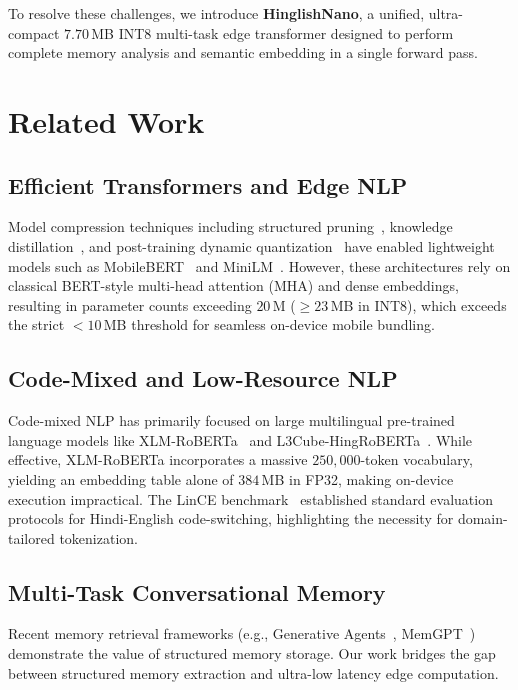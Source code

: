 \documentclass[11pt,a4paper]{article}
\begin{document}
To resolve these challenges, we introduce \textbf{HinglishNano}, a unified, ultra-compact $7.70$\,MB INT8 multi-task edge transformer designed to perform complete memory analysis and semantic embedding in a single forward pass.

\section{Related Work}

\subsection{Efficient Transformers and Edge NLP}
Model compression techniques including structured pruning~\cite{wang2020structured}, knowledge distillation~\cite{hinton2015distilling, sanh2019distilbert, jiao2020tinybert}, and post-training dynamic quantization~\cite{jacob2018quantization} have enabled lightweight models such as MobileBERT~\cite{sun2020mobilebert} and MiniLM~\cite{wang2020minilm}. However, these architectures rely on classical BERT-style multi-head attention (MHA) and dense embeddings, resulting in parameter counts exceeding $20$\,M ($\ge 23$\,MB in INT8), which exceeds the strict $<10$\,MB threshold for seamless on-device mobile bundling.

\subsection{Code-Mixed and Low-Resource NLP}
Code-mixed NLP has primarily focused on large multilingual pre-trained language models like XLM-RoBERTa~\cite{conneau2020unsupervised} and L3Cube-HingRoBERTa~\cite{nayak2021l3cube}. While effective, XLM-RoBERTa incorporates a massive $250,000$-token vocabulary, yielding an embedding table alone of $384$\,MB in FP32, making on-device execution impractical. The LinCE benchmark~\cite{aguilar2020lince} established standard evaluation protocols for Hindi-English code-switching, highlighting the necessity for domain-tailored tokenization.

\subsection{Multi-Task Conversational Memory}
Recent memory retrieval frameworks (e.g., Generative Agents~\cite{park2023generative}, MemGPT~\cite{packer2023memgpt}) demonstrate the value of structured memory storage. Our work bridges the gap between structured memory extraction and ultra-low latency edge computation.
\end{document}
